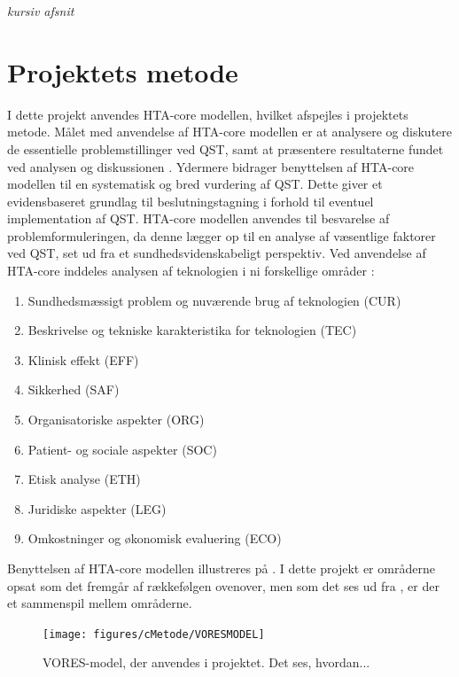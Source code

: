

\textit{kursiv afsnit}
\section{Projektets metode}
I dette projekt anvendes HTA-core modellen, hvilket afspejles i projektets metode. Målet med anvendelse af HTA-core modellen er at analysere og diskutere de essentielle problemstillinger ved QST, samt at præsentere resultaterne fundet ved analysen og diskussionen \citep{HTAcore}. Ydermere bidrager benyttelsen af HTA-core modellen til en systematisk og bred vurdering af QST. Dette giver et evidensbaseret grundlag til beslutningstagning i forhold til eventuel implementation af QST. \citep{metodehaandbogen} \citep{HTAcore} HTA-core modellen anvendes til besvarelse af problemformuleringen, da denne lægger op til en analyse af væsentlige faktorer ved QST, set ud fra et sundhedsvidenskabeligt perspektiv. Ved anvendelse af HTA-core inddeles analysen af teknologien i ni forskellige områder \citep{HTAcore}:


\begin{enumerate}
\item Sundhedsmæssigt problem og nuværende brug af teknologien (CUR)
\item Beskrivelse og tekniske karakteristika for teknologien (TEC)
\item Klinisk effekt (EFF)
\item Sikkerhed (SAF)
\item Organisatoriske aspekter (ORG)
\item Patient- og sociale aspekter (SOC)
\item Etisk analyse (ETH)
\item Juridiske aspekter (LEG)
\item Omkostninger og økonomisk evaluering (ECO)
\end{enumerate}


Benyttelsen af HTA-core modellen illustreres på . I dette projekt er områderne opsat som det fremgår af rækkefølgen ovenover, men som det ses ud fra , er der et sammenspil mellem områderne. 


\begin{figure}[H] 
	\begin{center}
		\texttt{[image: figures/cMetode/VORESMODEL]}
	\end{center}
	\caption{VORES-model, der anvendes i projektet. Det ses, hvordan...} 
	\label{fig:VORESMODEL} 
\end{figure}


